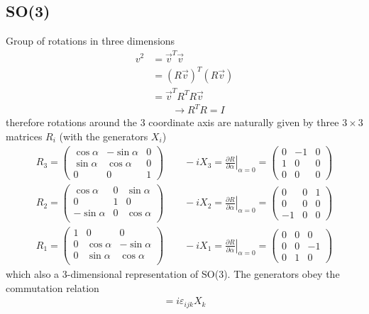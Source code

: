 \documentclass[10pt,a4paper]{book}
\theoremstyle{definition}
\begin{document}
\subsection{SO(3)}

Group of rotations in three dimensions
\begin{align}
v^2
&=\vec{v}^T\vec{v}\\
&=(R\vec{v})^T(R\vec{v})\\
&=\vec{v}^TR^TR\vec{v}\\
&\qquad \rightarrow R^TR=I
\end{align}
therefore rotations around the 3 coordinate axis are naturally given by three  $3\times3$ matrices $R_i$ (with the generators $X_i$)
\begin{align}
R_3=\left(\begin{matrix}
\cos\alpha  & -\sin\alpha & 0\\
\sin\alpha & \cos\alpha & 0\\
0 & 0 & 1 
\end{matrix}\right)
\qquad
-iX_3=\left.\frac{\partial R}{\partial\alpha}\right|_{\alpha=0}=\left(\begin{matrix}
0 & -1 & 0\\
1 & 0  & 0\\
0 & 0  & 0
\end{matrix}\right)\\
R_2=\left(\begin{matrix}
\cos\alpha  & 0 & \sin\alpha\\
0 & 1 & 0\\
-\sin\alpha & 0 & \cos\alpha\\
\end{matrix}\right)
\qquad
-iX_2=\left.\frac{\partial R}{\partial\alpha}\right|_{\alpha=0}=\left(\begin{matrix}
0 & 0  & 1\\
0 & 0  & 0\\
-1 & 0  & 0
\end{matrix}\right)\\
R_1=\left(\begin{matrix}
1 & 0 & 0 \\
0 & \cos\alpha & -\sin\alpha\\
0 & \sin\alpha &  \cos\alpha\\
\end{matrix}\right)
\qquad
-iX_1=\left.\frac{\partial R}{\partial\alpha}\right|_{\alpha=0}=\left(\begin{matrix}
0 & 0  & 0\\
0 & 0  & -1\\
0 & 1  & 0
\end{matrix}\right)
\end{align}  
which also a 3-dimensional representation of SO(3). The generators obey the commutation relation 
\begin{align}
[X_i,X_i]=i\varepsilon_{ijk}X_k
\end{align}
\end{document}
